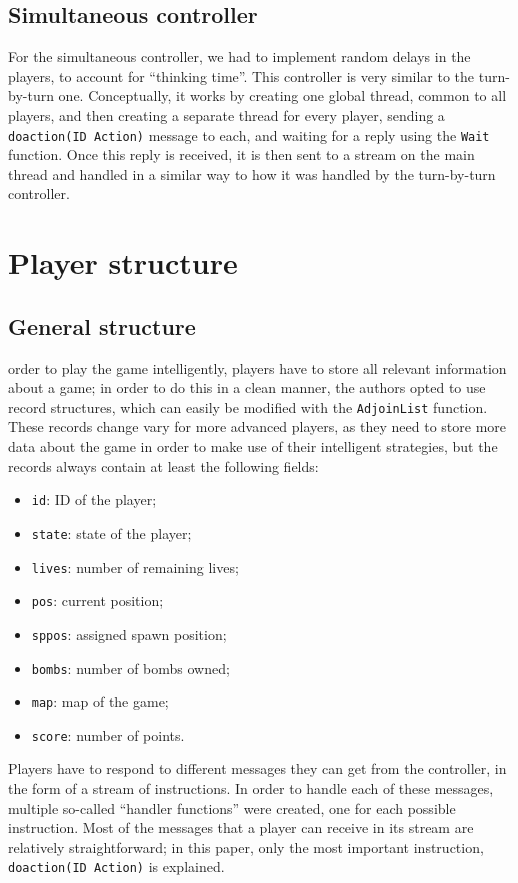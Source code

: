 \documentclass[12pt,journal]{IEEEtran}
\begin{document}
\subsection{Simultaneous controller}
For the simultaneous controller, we had to implement random delays in the players, to account for ``thinking time''.
This controller is very similar to the turn-by-turn one.
Conceptually, it works by creating one global thread, common to all players, and then creating a separate thread for every player, sending a \lstinline|doaction(ID Action)| message to each, and waiting for a reply using the \lstinline|Wait| function.
Once this reply is received, it is then sent to a stream on the main thread and handled in a similar way to how it was handled by the turn-by-turn controller.

\section{Player structure}
\subsection{General structure}
 order to play the game intelligently, players have to store all relevant information about a game; in order to do this in a clean manner, the authors opted to use record structures, which can easily be modified with the \lstinline|AdjoinList| function.
These records change vary for more advanced players, as they need to store more data about the game in order to make use of their intelligent strategies, but the records always contain at least the following fields:
\begin{itemize}
	\item \lstinline|id|: ID of the player;
	\item \lstinline|state|: state of the player;
	\item \lstinline|lives|: number of remaining lives;
	\item \lstinline|pos|: current position;
	\item \lstinline|sppos|: assigned spawn position;
	\item \lstinline|bombs|: number of bombs owned;
	\item \lstinline|map|: map of the game;
	\item \lstinline|score|: number of points.
\end{itemize}

Players have to respond to different messages they can get from the controller, in the form of a stream of instructions.
In order to handle each of these messages, multiple so-called ``handler functions'' were created, one for each possible instruction.
Most of the messages that a player can receive in its stream are relatively straightforward; in this paper, only the most important instruction, \lstinline|doaction(ID Action)| is explained.
\end{document}
